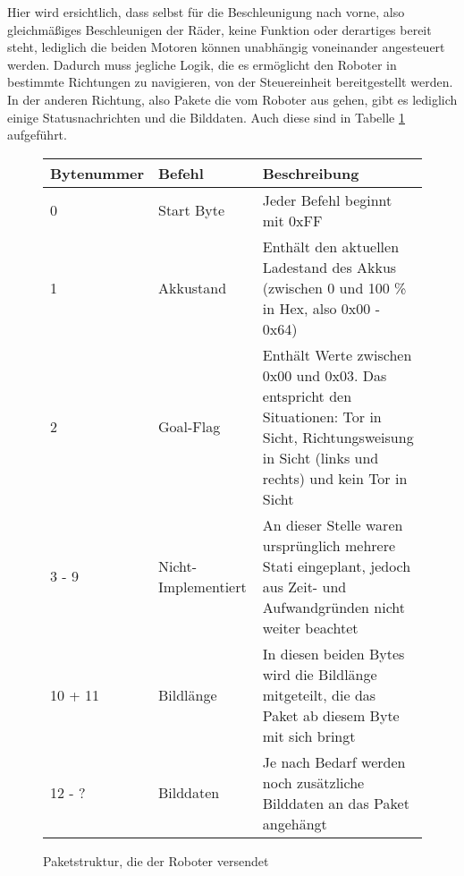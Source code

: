 Hier wird ersichtlich, dass selbst für die Beschleunigung nach vorne, also gleichmäßiges Beschleunigen der Räder, keine Funktion oder derartiges bereit steht, lediglich die beiden Motoren können unabhängig voneinander angesteuert werden. Dadurch muss jegliche Logik, die es ermöglicht den Roboter in bestimmte Richtungen zu navigieren, von der Steuereinheit bereitgestellt werden. \\

In der anderen Richtung, also Pakete die vom Roboter aus gehen, gibt es lediglich einige Statusnachrichten und die Bilddaten. Auch diese sind in Tabelle \ref{tab:robot_to_serv} aufgeführt.



\begin{figure}[!h]
	\begin{tabular}{||p{}||p{}||p{}||}
		\hline Bytenummer & Befehl & Beschreibung \\ 
		\hline 0 & Start Byte &  Jeder Befehl beginnt mit 0xFF\\ 
		\hline 1 & Akkustand & Enthält den aktuellen Ladestand des Akkus (zwischen 0 und 100 \% in Hex, also 0x00 - 0x64) \\ 
		\hline 2 & Goal-Flag & Enthält Werte zwischen 0x00 und 0x03. Das entspricht den Situationen: Tor in Sicht, Richtungsweisung in Sicht (links und rechts) und kein Tor in Sicht \\ 
		\hline 3 - 9 & Nicht-Implementiert & An dieser Stelle waren ursprünglich mehrere Stati eingeplant, jedoch aus Zeit- und Aufwandgründen nicht weiter beachtet \\ 
		\hline 10 + 11 & Bildlänge & In diesen beiden Bytes wird die Bildlänge mitgeteilt, die das Paket ab diesem Byte mit sich bringt \\ 
		\hline 12 - ? & Bilddaten & Je nach Bedarf werden noch zusätzliche Bilddaten an das Paket angehängt \\
		\hline
	\end{tabular}  
	\caption{Paketstruktur, die der Roboter versendet}
	\label{tab:robot_to_serv}
\end{figure}                         
